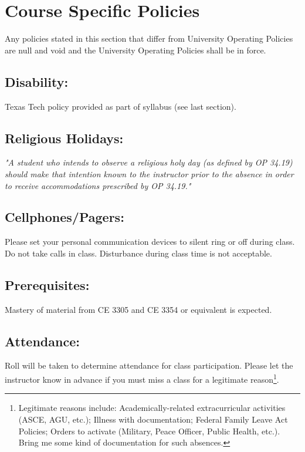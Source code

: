 \documentclass[12pt]{article}
\begin{document}
\section*{Course Specific Policies}
Any  policies stated in this section that differ from University Operating Policies are null and void and the University Operating Policies shall be in force.
\subsection*{Disability:}
Texas Tech policy provided as part of syllabus (see last section).


\subsection*{Religious Holidays:}
\textsl{ "A student who intends to observe a religious holy day (as defined by OP 34.19) should
make that intention known to the instructor prior to the absence in order to receive accommodations
prescribed by OP 34.19."}

\subsection*{Cellphones/Pagers: }
Please set your personal communication devices to silent ring or off during class. 
Do not take calls in class. Disturbance during class time is not acceptable.

\subsection*{Prerequisites:} 
Mastery of material from CE 3305 and CE 3354 or equivalent is expected.

\subsection*{Attendance:} Roll will be taken to determine attendance for class participation.  Please let the instructor know in advance if you must miss a class for a legitimate reason\footnote{Legitimate reasons include: Academically-related extracurricular activities (ASCE, AGU, etc.); Illness with documentation; Federal Family Leave Act Policies; Orders to activate (Military, Peace Officer, Public Health, etc.).  Bring me some kind of documentation for such absences.}. 
\end{document}
